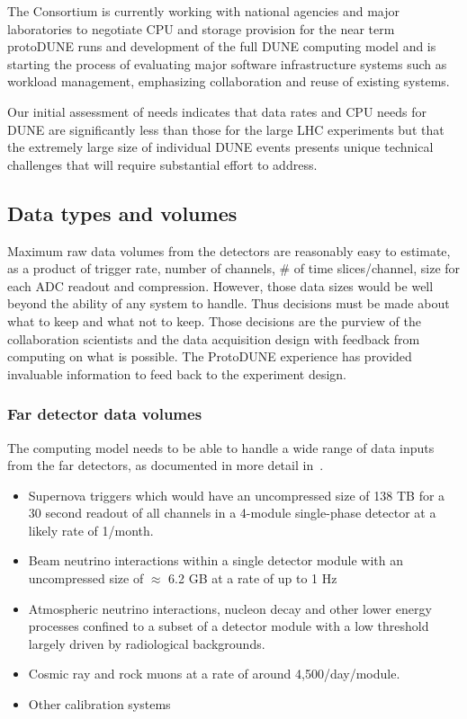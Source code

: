 The Consortium is currently working with national agencies and major laboratories to negotiate CPU and storage provision for the near term protoDUNE runs and development of the full DUNE computing model and is starting the process of evaluating major software infrastructure systems such as workload management, emphasizing collaboration and reuse of existing systems. 

Our initial assessment of needs indicates that data rates and CPU needs for DUNE are significantly less than those for the large LHC experiments but that the extremely large size of individual DUNE events presents unique technical challenges that will require substantial effort to address. 


\subsection{Data types and volumes}
Maximum raw data volumes from the detectors are reasonably easy to estimate, as a product of trigger rate, number of channels, \# of time slices/channel,  size for each ADC readout and compression. However, those data sizes would be well beyond the ability of any system to handle. Thus decisions must be made about what to keep and what not to keep. Those decisions are the purview of the collaboration scientists and the data acquisition design with feedback from computing on what is possible.  The ProtoDUNE experience has provided invaluable information to feed back to the experiment design. 




\subsubsection{Far detector data volumes}

The computing model needs to be able to handle a wide range of data inputs from the far detectors, as documented in more detail in~\cite{bib:docdb9240}. 

\begin{itemize}
\item Supernova triggers which would have an uncompressed size of 138 TB for a 30 second readout of all channels in a 4-module single-phase detector at a likely rate of 1/month.  
\item Beam neutrino interactions within a single detector module with an uncompressed size of $\approx$ 6.2 GB at a rate of up to 1 Hz
\item Atmospheric neutrino interactions, nucleon decay and other lower energy processes confined to a subset of a detector module with a low threshold largely driven by radiological backgrounds.
\item Cosmic ray and rock muons at a rate of around 4,500/day/module.
\item Other calibration systems 
\end{itemize}

